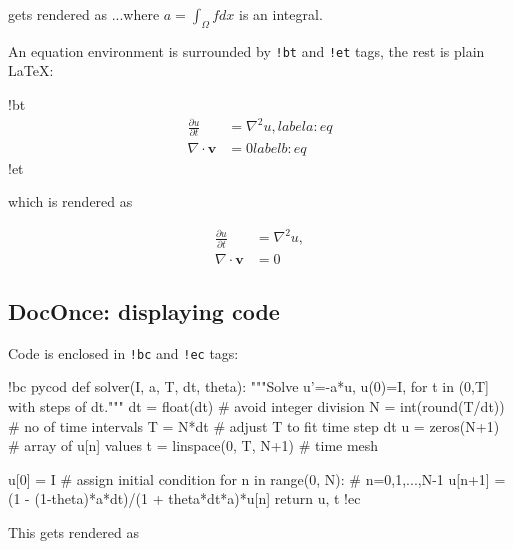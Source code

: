 \documentclass[%
oneside,                 %
final,                   %
10pt]{article}
\begin{document}
\edat

gets rendered as ...where $a=\int_{\Omega}fdx$ is an integral.

An equation environment is surrounded by \Verb?!bt? and \Verb?!et? tags,
the rest is plain {\LaTeX}:










\bdat
!bt
\begin{align}
\frac{\partial u}{\partial t} &= \nabla^2 u,
label{a:eq}\\
\nabla\cdot\pmb{v} & = 0
label{b:eq}
\end{align}
!et

\edat

which is rendered as

\begin{align}
\frac{\partial u}{\partial t} &= \nabla^2 u,
\label{_a:eq}\\
\nabla\cdot\pmb{v} & = 0
\label{_b:eq}
\end{align}

\subsection{DocOnce: displaying code}

Code is enclosed in \Verb?!bc? and \Verb?!ec? tags:
















\bdat
!bc pycod
def solver(I, a, T, dt, theta):
    """Solve u'=-a*u, u(0)=I, for t in (0,T] with steps of dt."""
    dt = float(dt)           # avoid integer division
    N = int(round(T/dt))     # no of time intervals
    T = N*dt                 # adjust T to fit time step dt
    u = zeros(N+1)           # array of u[n] values
    t = linspace(0, T, N+1)  # time mesh

    u[0] = I                 # assign initial condition
    for n in range(0, N):    # n=0,1,...,N-1
        u[n+1] = (1 - (1-theta)*a*dt)/(1 + theta*dt*a)*u[n]
    return u, t
!ec

\edat

This gets rendered as
\end{document}
